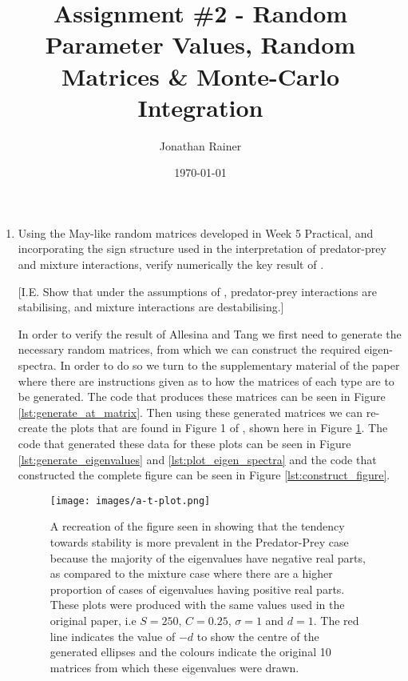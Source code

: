 \documentclass[11pt]{scrreprt}
\title{Assignment \#2 - Random Parameter Values, Random Matrices \& Monte-Carlo Integration}
\date{\today}
\author{Jonathan Rainer}
\begin{document}
	\fancyhf{}
	\chead{\thepage}
	\rhead{\today}
	\renewcommand{\headrulewidth}{0.3pt}
	\renewcommand{\footrulewidth}{0.3pt}
	\renewcommand{\footrulewidth}{0pt}
	\maketitle
	
	\setcounter{chapter}{1}
	\begin{enumerate}
	
		\item Using the May-like random matrices developed in Week 5 Practical, and incorporating the sign structure used in the \citet{Allesina2012} interpretation of predator-prey and mixture interactions, verify numerically the key result of \cite{Allesina2012}.
		
		[I.E. Show that under the assumptions of \cite{Allesina2012}, predator-prey interactions are stabilising, and mixture interactions are destabilising.]
		
		In order to verify the result of Allesina and Tang we first need to generate the necessary random matrices, from which we can construct the required eigen-spectra. In order to do so we turn to the supplementary material \cite{Allesina2012} of the paper where there are instructions given as to how the matrices of each type are to be generated. The code that produces these matrices can be seen in Figure \ref{lst:generate_at_matrix}. Then using these generated matrices we can re-create the plots that are found in Figure 1 of \cite{Allesina2012}, shown here in Figure \ref{fig:a-t_related_plot}. The code that generated these data for these plots can be seen in Figure \ref{lst:generate_eigenvalues} and \ref{lst:plot_eigen_spectra} and the code that constructed the complete figure can be seen in Figure \ref{lst:construct_figure}.
		
		\begin{figure}[ht]
			\begin{center}
				\texttt{[image: images/a-t-plot.png]}
			\end{center}
			\caption{A recreation of the figure seen in \citet{Allesina2012} showing that the tendency towards stability is more prevalent in the Predator-Prey case because the majority of the eigenvalues have negative real parts, as compared to the mixture case where there are a higher proportion of cases of eigenvalues having positive real parts. These plots were produced with the same values used in the original paper, i.e $S=250$, $C = 0.25$, $\sigma = 1$ and $d = 1$. The red line indicates the value of $-d$ to show the centre of the generated ellipses and the colours indicate the original 10 matrices from which these eigenvalues were drawn.}
			\label{fig:a-t_related_plot}
		\end{figure}
		

\end{enumerate}
\end{document}
